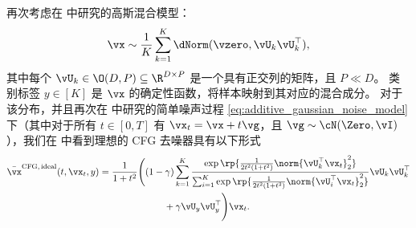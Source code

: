\documentclass[../../book-main_zh.tex]{subfiles}
\begin{document}
\begin{example}\label{example:denoising-gaussian-mixture-cfg-parameterization}
    再次考虑在  中研究的高斯混合模型：
    \begin{equation}
        \vx \sim \frac{1}{K}\sum_{k = 1}^{K}\dNorm(\vzero,
        \vU_{k}\vU_{k}^{\top}),
    \end{equation}
    其中每个 \(\vU_{k} \in \O(D, P) \subseteq \R^{D \times P}\) 是一个具有正交列的矩阵，且 $P \ll D$。
    类别标签 $y \in [K]$ 是 $\vx$ 的确定性函数，将样本映射到其对应的混合成分。
    对于该分布，并且再次在  中研究的简单噪声过程 \eqref{eq:additive_gaussian_noise_model} 下（其中对于所有 $t \in [0, T]$ 有 $\vx_t = \vx + t \vg$，且 $\vg \sim \cN(\Zero,
    \vI)$），我们在  中看到理想的 CFG 去噪器具有以下形式
    \begin{equation}\label{eq:cfg-denoiser-mog-low-rank-3}
        \begin{split}
            \bar{\vx}^{\mathrm{CFG,\,ideal}}(t, \vx_t, y)
            =
            \frac{1}{1 + t^{2}}
            \Biggl(
                &(1 - \gamma)
                \sum_{k = 1}^{K}\frac{\exp\rp{\frac{1}{2t^{2}(1
                + t^{2})}\norm{\vU_{k}^{\top}\vx_t}_{2}^{2}}}{\sum_{i
                    = 1}^{K}\exp\rp{\frac{1}{2t^{2}(1
                                +
                t^{2})}\norm{\vU_{i}^{\top}\vx_t}_{2}^{2}}}\vU_{k}\vU_{k}^{\top}
                \\
                &\qquad+
                \gamma
                \vU_{y}\vU_{y}^{\top}
            \Biggr)
            \vx_t.
        \end{split}
    \end{equation}


\end{example}
\end{document}
